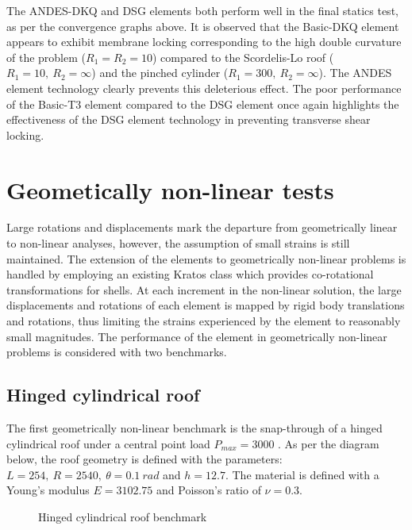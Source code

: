 The ANDES-DKQ and DSG elements both perform well in the final statics test, as per the convergence graphs above. It is observed that the Basic-DKQ element appears to exhibit membrane locking corresponding to the high double curvature of the problem ($R_1=R_2 = 10$) compared to the Scordelis-Lo roof ($R_1= 10,\ R_2 = \infty$) and the pinched cylinder ($R_1= 300,\ R_2 = \infty$). The ANDES element technology clearly prevents this deleterious effect. The poor performance of the Basic-T3 element compared to the DSG element once again highlights the effectiveness of the DSG element technology in preventing transverse shear locking.
\newpage
\section{Geometically non-linear tests}

Large rotations and displacements mark the departure from geometrically linear to non-linear analyses, however, the assumption of small strains is still maintained. The extension of the elements to geometrically non-linear problems is handled by employing an existing Kratos class which provides co-rotational transformations for shells. At each increment in the non-linear solution, the large displacements and rotations of each element is mapped by rigid body translations and rotations, thus limiting the strains experienced by the element to reasonably small magnitudes. The performance of the element in geometrically non-linear problems is considered with two benchmarks.

\subsection{Hinged cylindrical roof}
\label{validation:hinged cyl roof}
The first geometrically non-linear benchmark is the snap-through of a hinged cylindrical roof under a central point load $P_{max} = 3000$ \cite{Sze2004}. As per the diagram below, the roof geometry is defined with the parameters: $L = 254,\ R = 2540,\ \theta=0.1\ rad$ and $h = 12.7$. The material is defined with a Young's modulus $E = 3102.75$ and Poisson's ratio of $\nu = 0.3$.

 
\begin{figure}[H]
	\caption{\label{ref_label_overall}Hinged cylindrical roof benchmark}
\end{figure}

